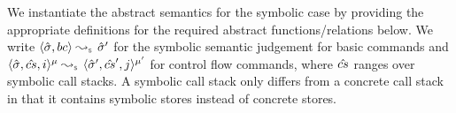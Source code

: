 We instantiate the abstract semantics for the symbolic case by providing the appropriate definitions 
for the required abstract functions/relations below.%
We write $\absbsemrule{\sstate, \bcmd}{\sstate'}{\symbolic}$ for the symbolic semantic 
judgement for basic commands and $\abssemrule{\sstate, \scs, i}{\sstate', \scs', j}{\mode}{\mode'}{\symbolic}$ 
for control flow commands, where $\hat{cs}$ ranges over symbolic call stacks. 
A symbolic call stack only differs from a concrete call stack in that it contains 
symbolic stores instead of concrete stores.



